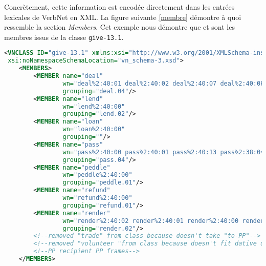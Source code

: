 Concrètement, cette information est encodée directement dans les entrées lexicales de VerbNet en XML. La figure suivante \ref{membre} démontre à quoi ressemble la section \emph{Members}. Cet exemple nous démontre que  et  sont les membres issus de la classe \texttt{give-13.1}.

\begin{lstlisting}[language=XML, caption = Les membres d'une classe, label=membre]
<VNCLASS ID="give-13.1" xmlns:xsi="http://www.w3.org/2001/XMLSchema-instance"
 xsi:noNamespaceSchemaLocation="vn_schema-3.xsd">
    <MEMBERS>
        <MEMBER name="deal" 
				wn="deal%2:40:01 deal%2:40:02 deal%2:40:07 deal%2:40:06" 
				grouping="deal.04"/>
        <MEMBER name="lend" 
				wn="lend%2:40:00" 
				grouping="lend.02"/>
        <MEMBER name="loan" 
				wn="loan%2:40:00" 
				grouping=""/>
        <MEMBER name="pass" 
				wn="pass%2:40:00 pass%2:40:01 pass%2:40:13 pass%2:38:04" 
				grouping="pass.04"/>
        <MEMBER name="peddle" 
				wn="peddle%2:40:00" 
				grouping="peddle.01"/>
        <MEMBER name="refund" 
				wn="refund%2:40:00" 
				grouping="refund.01"/>
        <MEMBER name="render" 
				wn="render%2:40:02 render%2:40:01 render%2:40:00 render%2:40:03" 
				grouping="render.02"/>
        <!--removed "trade" from class because doesn't take "to-PP"-->
        <!--removed "volunteer "from class because doesn't fit dative or-->
        <!--PP recipient PP frames-->
    </MEMBERS>
\end{lstlisting}

